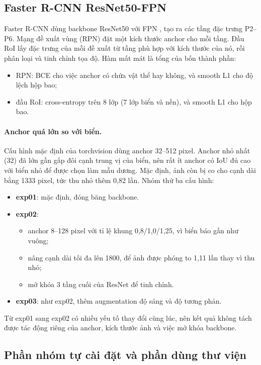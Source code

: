 \subsection{Faster R-CNN ResNet50-FPN}
\label{sec:frcnn}

Faster R-CNN \citep{ren2015faster} dùng backbone ResNet50 với FPN \citep{lin2017fpn}, tạo ra các tầng đặc trưng P2--P6.
Mạng đề xuất vùng (RPN) đặt một kích thước anchor cho mỗi tầng. Đầu RoI lấy đặc trưng của mỗi đề xuất từ tầng phù hợp với kích thước của nó, rồi phân loại và tinh chỉnh tọa độ.
Hàm mất mát là tổng của bốn thành phần:
\begin{itemize}
\item RPN: BCE cho việc anchor có chứa vật thể hay không, và smooth L1 cho độ lệch hộp bao;
\item đầu RoI: cross-entropy trên 8 lớp (7 lớp biển và nền), và smooth L1 cho hộp bao.
\end{itemize}

\paragraph{Anchor quá lớn so với biển.}
Cấu hình mặc định của torchvision dùng anchor 32--512 pixel. Anchor nhỏ nhất (32) đã lớn gần gấp đôi cạnh trung vị của biển, nên rất ít anchor có IoU đủ cao với biển nhỏ để được chọn làm mẫu dương.
Mặc định, ảnh còn bị co cho cạnh dài bằng 1333 pixel, tức thu nhỏ thêm 0,82 lần.
Nhóm thử ba cấu hình:
\begin{itemize}
\item \textbf{exp01}: mặc định, đóng băng backbone.
\item \textbf{exp02}:
  \begin{itemize}
  \item anchor 8--128 pixel với tỉ lệ khung 0,8/1,0/1,25, vì biển báo gần như vuông;
  \item nâng cạnh dài tối đa lên 1800, để ảnh được phóng to 1,11 lần thay vì thu nhỏ;
  \item mở khóa 3 tầng cuối của ResNet để tinh chỉnh.
  \end{itemize}
\item \textbf{exp03}: như exp02, thêm augmentation độ sáng và độ tương phản.
\end{itemize}
Từ exp01 sang exp02 có nhiều yếu tố thay đổi cùng lúc, nên kết quả không tách được tác động riêng của anchor, kích thước ảnh và việc mở khóa backbone.

\subsection{Phần nhóm tự cài đặt và phần dùng thư viện}
\label{sec:implementation}

